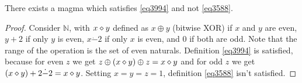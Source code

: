 \begin{theorem}\label{non_imp_3994_3588_thm}
  \leanok
  There exists a magma which satisfies \ref{eq3994} and not \ref{eq3588}.
\end{theorem}

\begin{proof} \leanok
  Consider $\mathbb{N}$, with $x \diamond y$ defined as $x \oplus y$ (bitwise XOR) if $x$ and $y$ are even,
  $y+2$ if only $y$ is even, $x \dot - 2$ if only $x$ is even, and $0$ if both are odd.
  Note that the range of the operation is the set of even naturals.
  Definition \ref{eq3994} is satisfied, because for even $z$ we get $z \oplus (x \diamond y) \oplus z = x \diamond y$
  and for odd $z$ we get $(x \diamond y) + 2 \dot - 2 = x \diamond y$.
  Setting $x = y = z = 1$, definition \ref{eq3588} isn't satisfied.
\end{proof}
